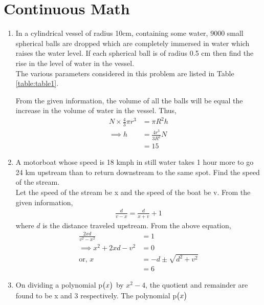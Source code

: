 \documentclass[journal,12pt,twocolumn]{IEEEtran}
\begin{document}
\section{Continuous Math}
\begin{enumerate}
    \item In a cylindrical vessel of radius 10cm, containing some water, 9000 small spherical balls are dropped which are completely immersed in water which raises the water level. If each spherical ball is of radius 0.5 cm then find the rise in the level of water in the vessel.\\
	    \solution The various parameters considered in this problem are listed in Table 
\eqref{table:table1}. 

\begin{table}[ht!]
	
\caption{}
\label{table:table1}	
\end{table}
From the given information, the volume of all the balls will be equal the increase in the volume of water in the vessel.  Thus, 
\begin{align}
	N \times \frac{4}{3}\pi r^3 &= \pi R^2 h
	\\
	\implies  h &=  \frac{4r^3}{3R^2}N
	\\
	&= 15
\end{align}
        \item A motorboat whose speed is 18 kmph in still water takes 1 hour more to go 24 km upstream than to return downstream to the same spot. Find the speed of the stream.\\
		\solution Let the speed of the stream be x and the speed of the boat be v.  From the given information, 
		    \begin{align}
			    \frac{d}{v-x} = \frac{d}{x+v} + 1
		    \end{align}
		    where $d$ is the distance traveled upstream.  From the above equation, 
		    \begin{align}
			    \frac{2xd}{v^2 - x^2} &= 1
			    \\
			    \implies 
			    x^2 +2xd -v^2 &=0
			    \\
			    \text{or, } x&= -d \pm \sqrt{d^2 + v^2}
			    \\
			    &= 6
		    \end{align}
 \item On dividing a polynomial p$\begin{pmatrix}x\end{pmatrix}$ by $x^2 - 4$, the quotient and remainder are found to be x and 3 respectively. The polynomial p$\begin{pmatrix}x\end{pmatrix}$
 \begin{enumerate}

\end{enumerate}
\end{enumerate}
\end{document}
